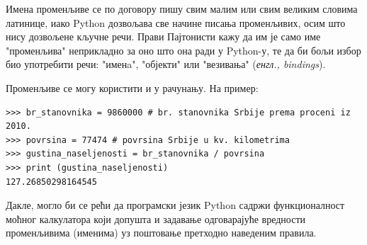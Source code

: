 Имена променљиве се по договору пишу свим малим или свим великим словима латинице, иако Python дозвољава све начине писања променљивих, осим што нису дозвољене кључне речи. Прави Пајтонисти\cite{pythonista} кажу да им је само име "променљива" неприкладно за оно што она ради у Python-у, те да би бољи избор био употребити речи: "именa",  "објекти" или "везивања" (\emph{енгл., bindings}).

Променљиве се могу користити и у рачунању. На пример:
\begin{lstlisting}[caption = Пример коришћења променљивих, label = variables]
>>> br_stanovnika = 9860000 # br. stanovnika Srbije prema proceni iz 2010.
>>> povrsina = 77474 # povrsina Srbije u kv. kilometrima
>>> gustina_naseljenosti = br_stanovnika / povrsina
>>> print (gustina_naseljenosti)
127.26850298164545
\end{lstlisting}

Дакле, могло би се рећи да програмски језик Python садржи функционалност моћног калкулатора који допушта и задавање одговарајуће вредности променљивима (именима) уз поштовање претходно наведеним правила.
